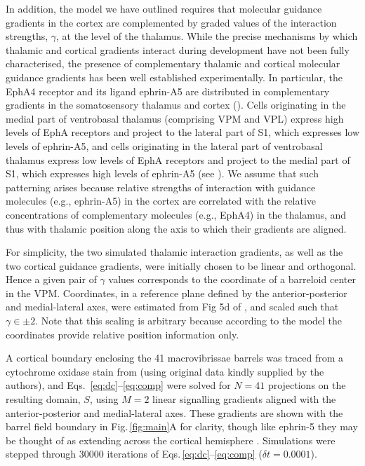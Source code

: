 \documentclass[9pt,lineno]{elife}
\newcommand{\cmnt}[1]{\textcolor{colcmnt}{#1}}
\newcommand{\MPone}[1]{\textcolor{colmpone}{#1}}
\newcommand{\mpfour}[1]{\textcolor{colmpfour}{#1}}
\begin{document}
\MPone{In addition, the model we have outlined requires that molecular
  guidance gradients in the cortex are complemented by graded values of the
  interaction strengths, $\gamma$, at the level of the thalamus. While the
  precise mechanisms by which thalamic and cortical gradients interact during
  development have not been fully characterised, the presence of complementary
  thalamic and cortical molecular guidance gradients has been well established
  experimentally. In particular, the EphA4 receptor and its ligand ephrin-A5
  are distributed in complementary gradients in the somatosensory thalamus and
  cortex} (\citealp{vanderhaeghen_mapping_2000,miller_epha7-ephrin-a5_2006}).
\MPone{Cells originating in the medial part of ventrobasal thalamus
  (comprising VPM and VPL) express high levels of EphA receptors and project
  to the lateral part of S1, which expresses low levels of ephrin-A5, and
  cells originating in the lateral part of ventrobasal thalamus express low
  levels of EphA receptors and project to the medial part of S1, which
  expresses high levels of ephrin-A5} (see
\citealp{gao_regulation_1998,dufour_area_2003,vanderhaeghen_developmental_2004,speer_grading_2005,torii_role_2013}).
\MPone{We assume that such patterning arises because relative strengths of
  interaction with guidance molecules (e.g., ephrin-A5) in the cortex are
  correlated with the relative concentrations of complementary molecules
  (e.g., EphA4) in the thalamus, and thus with thalamic position along the
  axis to which their gradients are aligned.}

\MPone{For simplicity, the two simulated thalamic interaction gradients, as
  well as the two cortical guidance gradients, were initially chosen to be
  linear and orthogonal. Hence a given pair of $\gamma$ values corresponds to
  the coordinate of a barreloid center in the VPM. Coordinates, in a reference
  plane defined by the anterior-posterior and medial-lateral axes, were
  estimated from Fig 5d of} \cite{haidarliu_size_2001}, \MPone{and scaled
  such that $\gamma\in\pm 2$. Note that this scaling is arbitrary because
  according to the model the coordinates provide relative position information
  only.}

A cortical boundary enclosing \cmnt{the} 41 \cmnt{macrovibrissae} barrels was
traced from a cytochrome oxidase stain from \cite{zheng_signal_2001}
\cmnt{(using original data kindly supplied by the authors)}, and
Eqs.~\ref{eq:dc}--\ref{eq:comp} were solved for $N=41$ projections on the
resulting domain, $S$, using $M=2$ linear signalling gradients aligned with
the anterior-posterior and medial-lateral axes.  \mpfour{These gradients are
  shown with the barrel field boundary in Fig.\,\ref{fig:main}A for clarity,
  though like ephrin-5 they may be thought of as extending across the cortical
  hemisphere \citep{miller_epha7-ephrin-a5_2006}. Simulations were stepped
  through 30000 iterations of Eqs.\,\ref{eq:dc}--\ref{eq:comp} ($\delta
  t=0.0001$).}
\end{document}
